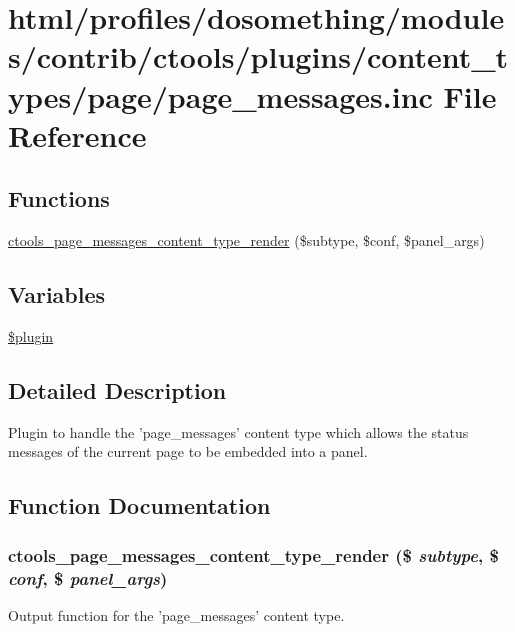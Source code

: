 \hypertarget{page__messages_8inc}{
\section{html/profiles/dosomething/modules/contrib/ctools/plugins/content\_\-types/page/page\_\-messages.inc File Reference}
\label{page__messages_8inc}
}
\subsection*{Functions}
\begin{DoxyCompactItemize}
\item 
\hyperlink{page__messages_8inc_a0760caa64cc186b76bef918084c48fc9}{ctools\_\-page\_\-messages\_\-content\_\-type\_\-render} (\$subtype, \$conf, \$panel\_\-args)
\end{DoxyCompactItemize}
\subsection*{Variables}
\begin{DoxyCompactItemize}
\item 
\hyperlink{page__messages_8inc_ada8a7130088351710bb02ed622d6bf65}{\$plugin}
\end{DoxyCompactItemize}


\subsection{Detailed Description}
Plugin to handle the 'page\_\-messages' content type which allows the status messages of the current page to be embedded into a panel. 

\subsection{Function Documentation}
\hypertarget{page__messages_8inc_a0760caa64cc186b76bef918084c48fc9}{
\subsubsection[{ctools\_\-page\_\-messages\_\-content\_\-type\_\-render}]{\setlength{\rightskip}{0pt plus 5cm}ctools\_\-page\_\-messages\_\-content\_\-type\_\-render (\$ {\em subtype}, \/  \$ {\em conf}, \/  \$ {\em panel\_\-args})}}
\label{page__messages_8inc_a0760caa64cc186b76bef918084c48fc9}
Output function for the 'page\_\-messages' content type.

